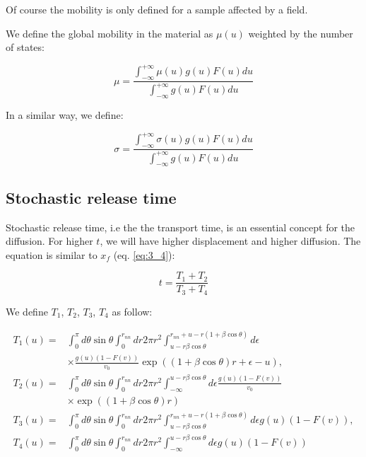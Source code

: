 Of course the mobility is only defined for a sample affected by a field.

We define the global mobility in the material as $\mu(u)$ weighted by the number of states:

\begin{equation}
    \mu = \frac{\int_{-\infty}^{+\infty}\mu(u)g(u)F(u)du}{\int_{-\infty}^{+\infty}g(u)F(u)du}
\end{equation}

In a similar way, we define:

\begin{equation}
    \sigma = \frac{\int_{-\infty}^{+\infty}\sigma(u)g(u)F(u)du}{\int_{-\infty}^{+\infty}g(u)F(u)du}
\end{equation}

\subsection{Stochastic release time}

Stochastic release time, i.e the the transport time, is an essential concept for the diffusion. For higher $t$, we will have higher displacement and higher diffusion. The equation is similar to $x_f$ (eq. \ref{eq:3_4}):

\begin{equation}
    t = \frac{T_1 + T_2}{T_3 + T_4}
    \label{eq:t}
\end{equation}

We define $T_1$, $T_2$, $T_3$, $T_4$ as follow:

\begin{equation}
    \begin{aligned}
    T_{1}\left(u\right)=& \int_{0}^{\pi} d \theta \sin \theta \int_{0}^{r_{n n}} d r 2 \pi r^{2} \int_{u-r \beta \cos \theta}^{r_{n n}+u-r(1+\beta \cos \theta)} d \epsilon \\
    & \times \frac{g(u)(1 - F(v))}{v_{0}} \exp \left((1+\beta \cos \theta) r+\epsilon-u\right), \\
    T_{2}\left(u\right)=& \int_{0}^{\pi} d \theta \sin \theta \int_{0}^{r_{n n}} d r 2 \pi r^{2} \int_{-\infty}^{u-r \beta \cos \theta} d \epsilon \frac{g(u)(1 - F(v))}{v_{0}} \\
    & \times \exp ((1+\beta \cos \theta) r) \\
    T_{3}\left(u\right)=& \int_{0}^{\pi} d \theta \sin \theta \int_{0}^{r_{n n}} d r 2 \pi r^{2} \int_{u-r \beta \cos \theta}^{r_{n n}+u-r(1+\beta \cos \theta)} d \epsilon g(u)(1 - F(v)), \\
    T_{4}\left(u\right)=& \int_{0}^{\pi} d \theta \sin \theta \int_{0}^{r_{n n}} d r 2 \pi r^{2} \int_{-\infty}^{u-r \beta \cos \theta} d \epsilon g(u)(1 - F(v))
    \end{aligned}
\end{equation}

